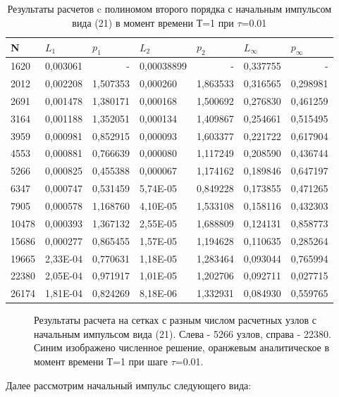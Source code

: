 \documentclass[14pt]{article}
\begin{document}
\begin{table}[!h!]
\caption{Результаты расчетов c полиномом второго порядка с начальным импульсом вида (21) в момент времени Т=1 при $\tau$=0.01}
\begin{tabular}{|l|l|l|l|l|l|l|}
\hline
\multicolumn{1}{|l|}{N} & \multicolumn{1}{l|}{$L_1$}        & \multicolumn{1}{l|}{$p_1$} & \multicolumn{1}{l|}{$L_2$}     & \multicolumn{1}{l|}{$p_2$} & \multicolumn{1}{l|}{$L_\infty$} & \multicolumn{1}{l|}{$p_\infty$} \\ \hline
1620  & 0,003061 & \multicolumn{1}{r|}{-} & 0,00038899 & \multicolumn{1}{r|}{-}       & 0,337755 & \multicolumn{1}{r|}{-} \\ \hline
2012  & 0,002208 & 1,507353               & 0,000260   & 1,863533 & 0,316565 & 0,298981               \\ \hline
2691  & 0,001478 & 1,380171               & 0,000168   & 1,500692 & 0,276830 & 0,461259               \\ \hline
3164  & 0,001188 & 1,352051               & 0,000134   & 1,409867 & 0,254661 & 0,515495               \\ \hline
3959  & 0,000981 & 0,852915               & 0,000093   & 1,603377 & 0,221722 & 0,617904               \\ \hline
4553  & 0,000881 & 0,766639               & 0,000080   & 1,117249 & 0,208590 & 0,436744               \\ \hline
5266  & 0,000825 & 0,455388               & 0,000067   & 1,174162 & 0,189846 & 0,647197               \\ \hline
6347  & 0,000747 & 0,531459               & 5,74E-05   & 0,849228 & 0,173855 & 0,471265               \\ \hline
7905  & 0,000578 & 1,168760               & 4,10E-05   & 1,533108 & 0,158116 & 0,432303               \\ \hline
10478 & 0,000393 & 1,367132               & 2,55E-05   & 1,688809 & 0,124131 & 0,858773               \\ \hline
15686 & 0,000277 & 0,865455               & 1,57E-05   & 1,194628 & 0,110635 & 0,285264               \\ \hline
19665 & 2,33E-04 & 0,770631               & 1,18E-05   & 1,283464 & 0,093044 & 0,765994               \\ \hline
22380 & 2,05E-04 & 0,971917               & 1,01E-05   & 1,202706 & 0,092711 & 0,027715               \\ \hline
26174 & 1,81E-04 & 0,824269               & 8,18E-06   & 1,332931 & 0,084930 & 0,559765               \\ \hline
\end{tabular}

\end{table}
\begin{figure}[H]
\caption{Результаты расчета на сетках с разным числом расчетных узлов с начальным импульсом вида (21). Слева - 5266 узлов, справа - 22380. Синим изображено численное решение, оранжевым аналитическое в момент времени Т=1 при шаге $\tau$=0.01.}
\end{figure}
\newpage
Далее рассмотрим начальный импульс следующего вида:
\end{document}
